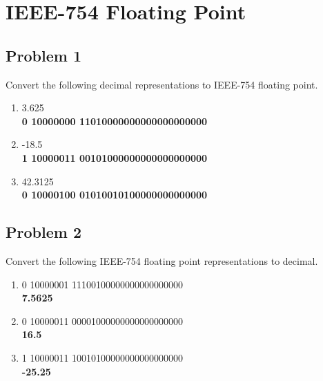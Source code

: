 \documentclass{article}
\begin{document}


\newpage
\section*{IEEE-754 Floating Point}
\subsection*{Problem 1}
Convert the following decimal representations to IEEE-754 floating point.
\begin{enumerate}[label=\alph*.]
    \item 3.625 \\
    \textbf{0 10000000 11010000000000000000000}
    \item -18.5 \\
    \textbf{1 10000011 00101000000000000000000}
    \item 42.3125 \\
    \textbf{0 10000100 01010010100000000000000}
\end{enumerate}

\subsection*{Problem 2}
Convert the following IEEE-754 floating point representations to decimal.
\begin{enumerate}[label=\alph*.]
    \item 0 10000001 11100100000000000000000 \\
    \textbf{7.5625}
    \item 0 10000011 00001000000000000000000 \\
    \textbf{16.5}
    \item 1 10000011 10010100000000000000000 \\
    \textbf{-25.25}
\end{enumerate}
\end{document}
